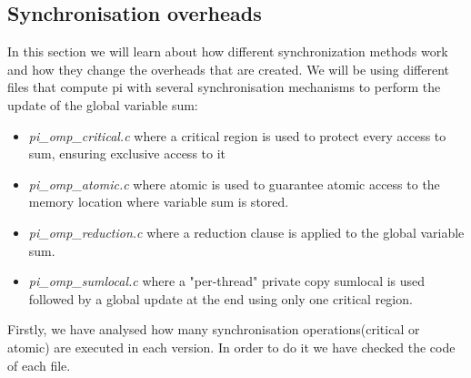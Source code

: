 \documentclass[12]{article}
\begin{document}
\subsection{Synchronisation overheads}
In this section we will learn about how different synchronization methods work and how they change the overheads that are created. We will be using different files that compute pi with several synchronisation mechanisms to perform the update of the global variable sum:
\begin{itemize}
\item \textit{pi\_omp\_critical.c} where a critical region is used to protect every access to sum, ensuring exclusive access to it
\item \textit{pi\_omp\_atomic.c} where atomic is used to guarantee atomic access to the memory location where variable sum is stored. 
\item \textit{pi\_omp\_reduction.c} where a reduction clause is applied to the global variable sum. 
\item \textit{pi\_omp\_sumlocal.c} where a "per-thread" private copy sumlocal is used followed by a global update at the end using only one critical region. 
\end{itemize} 

Firstly, we have analysed how many synchronisation operations(critical or atomic) are executed in each version.  In order to do it we have checked the code of each file. 
\end{document}
